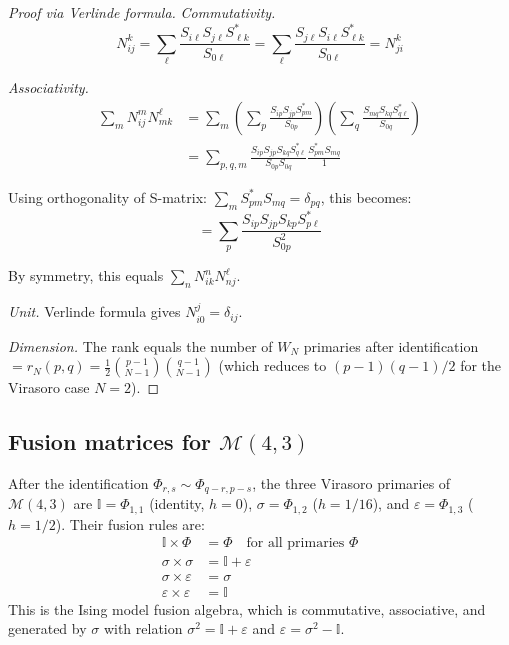 \begin{proof}[Proof via Verlinde formula]

\emph{Commutativity.}
\[N_{ij}^k = \sum_\ell \frac{S_{i\ell}S_{j\ell}S_{\ell k}^*}{S_{0\ell}}
= \sum_\ell \frac{S_{j\ell}S_{i\ell}S_{\ell k}^*}{S_{0\ell}} = N_{ji}^k\]



\emph{Associativity.}
\begin{align}
\sum_m N_{ij}^m N_{mk}^\ell &= \sum_m \left(\sum_p \frac{S_{ip}S_{jp}S_{pm}^*}{S_{0p}}\right)
\left(\sum_q \frac{S_{mq}S_{kq}S_{q\ell}^*}{S_{0q}}\right) \\
&= \sum_{p,q,m} \frac{S_{ip}S_{jp}S_{kq}S_{q\ell}^*}{S_{0p}S_{0q}}
\frac{S_{pm}^* S_{mq}}{1}
\end{align}

Using orthogonality of S-matrix: $\sum_m S_{pm}^* S_{mq} = \delta_{pq}$, this becomes:
\[= \sum_p \frac{S_{ip}S_{jp}S_{kp}S_{p\ell}^*}{S_{0p}^2}\]

By symmetry, this equals $\sum_n N_{ik}^n N_{nj}^\ell$.

\emph{Unit.} Verlinde formula gives $N_{i0}^j = \delta_{ij}$.

\emph{Dimension.} The rank equals the number of $W_N$ primaries after identification $= r_N(p,q) = \frac{1}{2}\binom{p-1}{N-1}\binom{q-1}{N-1}$ (which reduces to $(p-1)(q-1)/2$ for the Virasoro case $N=2$).
\end{proof}

\subsection{\texorpdfstring{Fusion matrices for $\mathcal{M}(4,3)$}{Fusion matrices for M(4,3)}}
\label{subsec:fusion-matrices-3-4}

\begin{theorem}\label{thm:fusion-3-4-complete}
After the identification $\Phi_{r,s} \sim \Phi_{q-r,p-s}$, the three Virasoro primaries of $\mathcal{M}(4,3)$ are $\mathbb{I} = \Phi_{1,1}$ (identity, $h=0$), $\sigma = \Phi_{1,2}$ ($h=1/16$), and $\varepsilon = \Phi_{1,3}$ ($h=1/2$). Their fusion rules are:
\begin{align}
\mathbb{I} \times \Phi &= \Phi \quad \text{for all primaries } \Phi \\
\sigma \times \sigma &= \mathbb{I} + \varepsilon \\
\sigma \times \varepsilon &= \sigma \\
\varepsilon \times \varepsilon &= \mathbb{I}
\end{align}
This is the Ising model fusion algebra, which is commutative, associative, and generated by $\sigma$ with relation $\sigma^2 = \mathbb{I} + \varepsilon$ and $\varepsilon = \sigma^2 - \mathbb{I}$.
\end{theorem}

